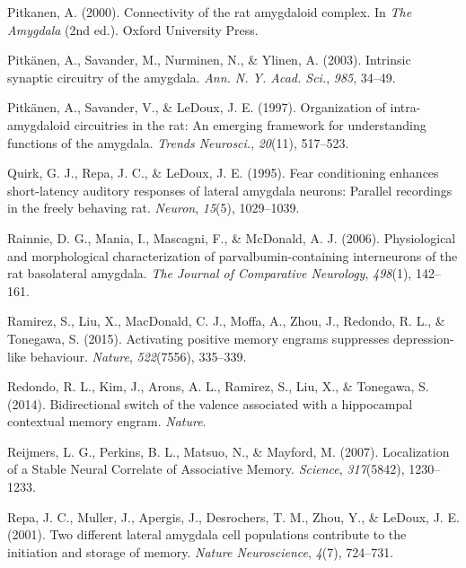 \documentclass[12pt,a4paperpaper,]{report}
\begin{document}
\hypertarget{ref-pitkanenux5fconnectivityux5f2000}{}
Pitkanen, A. (2000). Connectivity of the rat amygdaloid complex. In
\emph{The Amygdala} (2nd ed.). Oxford University Press.

\hypertarget{ref-pitkanenux5fintrinsicux5f2003}{}
Pitkänen, A., Savander, M., Nurminen, N., \& Ylinen, A. (2003).
Intrinsic synaptic circuitry of the amygdala. \emph{Ann. N. Y. Acad.
Sci.}, \emph{985}, 34--49.

\hypertarget{ref-pitkanenux5forganizationux5f1997}{}
Pitkänen, A., Savander, V., \& LeDoux, J. E. (1997). Organization of
intra-amygdaloid circuitries in the rat: An emerging framework for
understanding functions of the amygdala. \emph{Trends Neurosci.},
\emph{20}(11), 517--523.

\hypertarget{ref-quirkux5ffearux5f1995}{}
Quirk, G. J., Repa, J. C., \& LeDoux, J. E. (1995). Fear conditioning
enhances short-latency auditory responses of lateral amygdala neurons:
Parallel recordings in the freely behaving rat. \emph{Neuron},
\emph{15}(5), 1029--1039.

\hypertarget{ref-rainnieux5fphysiologicalux5f2006}{}
Rainnie, D. G., Mania, I., Mascagni, F., \& McDonald, A. J. (2006).
Physiological and morphological characterization of
parvalbumin-containing interneurons of the rat basolateral amygdala.
\emph{The Journal of Comparative Neurology}, \emph{498}(1), 142--161.

\hypertarget{ref-ramirezux5factivatingux5f2015}{}
Ramirez, S., Liu, X., MacDonald, C. J., Moffa, A., Zhou, J., Redondo, R.
L., \& Tonegawa, S. (2015). Activating positive memory engrams
suppresses depression-like behaviour. \emph{Nature}, \emph{522}(7556),
335--339.

\hypertarget{ref-redondoux5fbidirectionalux5f2014}{}
Redondo, R. L., Kim, J., Arons, A. L., Ramirez, S., Liu, X., \&
Tonegawa, S. (2014). Bidirectional switch of the valence associated with
a hippocampal contextual memory engram. \emph{Nature}.

\hypertarget{ref-reijmersux5flocalizationux5f2007}{}
Reijmers, L. G., Perkins, B. L., Matsuo, N., \& Mayford, M. (2007).
Localization of a Stable Neural Correlate of Associative Memory.
\emph{Science}, \emph{317}(5842), 1230--1233.

\hypertarget{ref-repaux5ftwoux5f2001}{}
Repa, J. C., Muller, J., Apergis, J., Desrochers, T. M., Zhou, Y., \&
LeDoux, J. E. (2001). Two different lateral amygdala cell populations
contribute to the initiation and storage of memory. \emph{Nature
Neuroscience}, \emph{4}(7), 724--731.
\end{document}
